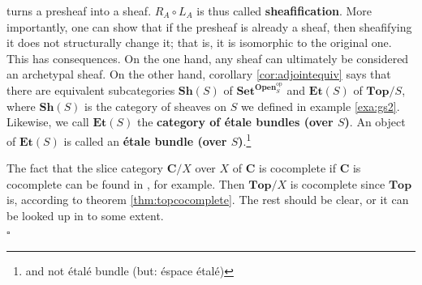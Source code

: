 \begin{exa}
turns a presheaf into a sheaf.
$R_{A} \circ L_{A}$ is thus called \textbf{sheafification}.
More importantly, one can show that if the presheaf is already a sheaf, then sheafifying it does not structurally change it; that is, it is isomorphic to the original one.
This has consequences.
On the one hand, any sheaf can ultimately be considered an archetypal sheaf.
On the other hand, corollary \ref{cor:adjointequiv} says that there are equivalent subcategories $\mathbf{Sh}(S)$ of $\mathbf{Set}^{\mathbf{Open}_{S}^{\textrm{op}}}$ and $\mathbf{Et}(S)$ of $\mathbf{Top} \slash S$, where $\mathbf{Sh}(S)$ is the category of sheaves on $S$ we defined in example \ref{exa:gs2}.
Likewise, we call $\mathbf{Et}(S)$ the \textbf{category of {\'e}tale bundles (over $S$)}.
An object of $\mathbf{Et}(S)$ is called an \textbf{{\'e}tale bundle (over $S$)}.\footnote{and not {\'e}tal{\'e} bundle (but: {\'e}space {\'e}tal{\'e})}
\end{exa}
\begin{prf}
The fact that the slice category $\mathbf{C} \slash X$ over $X$ of $\mathbf{C}$ is cocomplete if $\mathbf{C}$ is cocomplete can be found in \cite{52fbba46}, for example.
Then $\mathbf{Top} \slash X$ is cocomplete since $\mathbf{Top}$ is, according to theorem \ref{thm:topcocomplete}.
The rest should be clear, or it can be looked up in \cite{c55c71e8} to some extent.
\\
\phantom{proven}
\hfill
$\square$
\end{prf}
